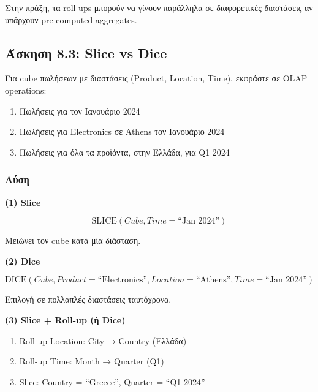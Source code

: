 \begin{infobox}[Optimization]
Στην πράξη, τα roll-ups μπορούν να γίνουν παράλληλα σε διαφορετικές διαστάσεις
αν υπάρχουν pre-computed aggregates.
\end{infobox}

\subsection{Άσκηση 8.3: Slice vs Dice}

\begin{formulabox}[Εκφώνηση]
Για cube πωλήσεων με διαστάσεις (Product, Location, Time), εκφράστε σε OLAP
operations:

\begin{enumerate}
    \item Πωλήσεις για τον Ιανουάριο 2024
    \item Πωλήσεις για Electronics σε Athens τον Ιανουάριο 2024
    \item Πωλήσεις για όλα τα προϊόντα, στην Ελλάδα, για Q1 2024
\end{enumerate}
\end{formulabox}

\subsubsection*{Λύση}

\textbf{(1) Slice}

$$\text{SLICE}(Cube, Time = \text{``Jan 2024''})$$

Μειώνει τον cube κατά μία διάσταση.

\textbf{(2) Dice}

$$\text{DICE}(Cube, Product = \text{``Electronics''}, Location = \text{``Athens''}, Time = \text{``Jan 2024''})$$

Επιλογή σε πολλαπλές διαστάσεις ταυτόχρονα.

\textbf{(3) Slice + Roll-up (ή Dice)}

\begin{enumerate}
    \item Roll-up Location: City → Country (Ελλάδα)
    \item Roll-up Time: Month → Quarter (Q1)
    \item Slice: Country = ``Greece'', Quarter = ``Q1 2024''
\end{enumerate}

